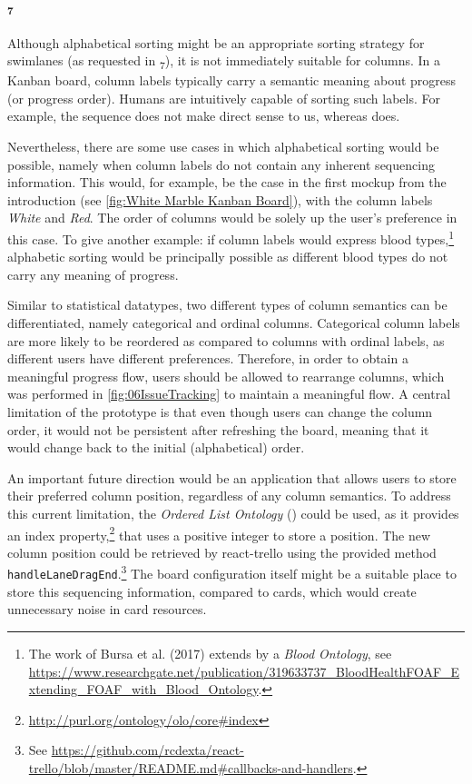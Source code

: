 \noindent \paragraph{\textsubscript{7}} Although alphabetical sorting might be an appropriate sorting strategy for swimlanes (as requested in \textsubscript{7}), it is not immediately suitable for columns. In a Kanban board, column labels typically carry a semantic meaning about progress (or progress order). Humans are intuitively capable of sorting such labels. For example, the sequence  does not make direct sense to us, whereas  does.

Nevertheless, there are some use cases in which alphabetical sorting would be possible, namely when column labels do not contain any inherent sequencing information. This would, for example, be the case in the first mockup from the introduction (see \autoref{fig:White Marble Kanban Board}), with the column labels \textit{White} and \textit{Red}. The order of columns would be solely up the user’s preference in this case. To give another example: if column labels would express blood types,\footnote{The work of Bursa et al. (2017) extends  by a \textit{Blood Ontology}, see \url{https://www.researchgate.net/publication/319633737_BloodHealthFOAF_Extending_FOAF_with_Blood_Ontology}.} alphabetic sorting would be principally possible as different blood types do not carry any meaning of progress.

Similar to statistical datatypes, two different types of column semantics can be differentiated, namely categorical and ordinal columns. Categorical column labels are more likely to be reordered as compared to columns with ordinal labels, as different users have different preferences. Therefore, in order to obtain a meaningful progress flow, users should be allowed to rearrange columns, which was performed in \autoref{fig:06IssueTracking} to maintain a meaningful flow. A central limitation of the prototype is that even though users can change the column order, it would not be persistent after refreshing the board, meaning that it would change back to the initial (alphabetical) order.

An important future direction would be an application that allows users to store their preferred column position, regardless of any column semantics. To address this current limitation, the \textit{Ordered List Ontology} () could be used, as it provides an index property,\footnote{\url{http://purl.org/ontology/olo/core\#index}} that uses a positive integer to store a position. The new column position could be retrieved by react-trello using the provided method \texttt{handleLaneDragEnd}.\footnote{See \url{https://github.com/rcdexta/react-trello/blob/master/README.md\#callbacks-and-handlers}.} The board configuration itself might be a suitable place to store this sequencing information, compared to cards, which would create unnecessary noise in card resources.


